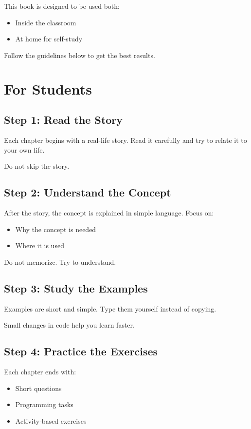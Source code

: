 This book is designed to be used both:
\begin{itemize}
    \item Inside the classroom
    \item At home for self-study
\end{itemize}

Follow the guidelines below to get the best results.

\section*{For Students}

\subsection*{Step 1: Read the Story}

Each chapter begins with a real-life story.
Read it carefully and try to relate it to your own life.

Do not skip the story.

\subsection*{Step 2: Understand the Concept}

After the story, the concept is explained in simple language.
Focus on:
\begin{itemize}
    \item Why the concept is needed
    \item Where it is used
\end{itemize}

Do not memorize.
Try to understand.

\subsection*{Step 3: Study the Examples}

Examples are short and simple.
Type them yourself instead of copying.

Small changes in code help you learn faster.

\subsection*{Step 4: Practice the Exercises}

Each chapter ends with:
\begin{itemize}
    \item Short questions
    \item Programming tasks
    \item Activity-based exercises
\end{itemize}

